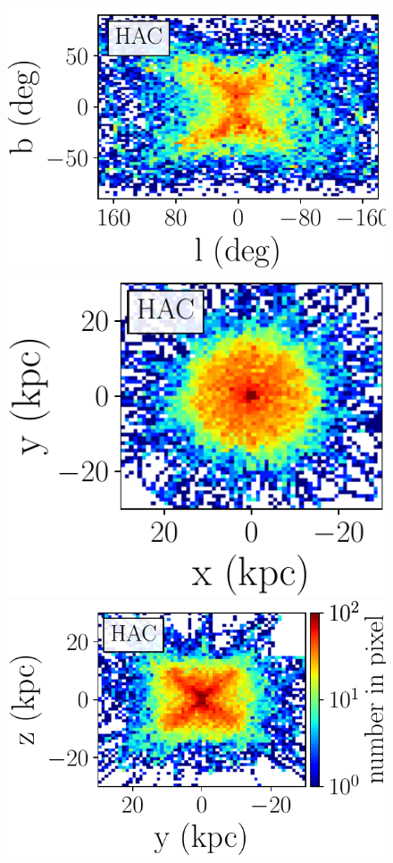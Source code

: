 \documentclass[fleqn,usenatbib]{mnras}
\begin{document}
\begin{figure}
	     \includegraphics[scale=0.302]{HAC_orbits_8Gyrs_lb_defaultmass.pdf}
             \includegraphics[scale=0.302]{HAC_orbits_8Gyrs_xy_defaultmass.pdf}
             \includegraphics[scale=0.302]{HAC_orbits_8Gyrs_yz_defaultmass.pdf}

\end{figure}
\end{document}
